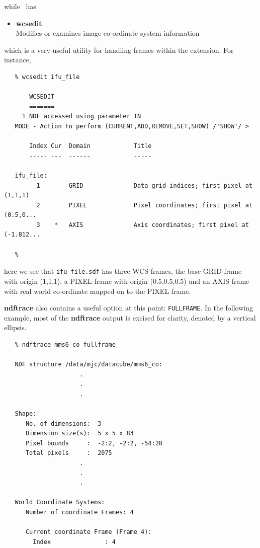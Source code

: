 \documentclass[twoside,11pt]{article}
\newcommand{\xref}[3]{#1}
\begin{document}
\begin{\htmlonly}
{while \CCDPACK\ has

\begin{itemize}  
\item{\xref{{\bf wcsedit}}{sun139}{WCSEDIT}}\\
Modifies or examines image co-ordinate system information
\end{itemize}

which is a very useful utility for handling frames within the extension.
For instance,

\small\begin{verbatim}
   % wcsedit ifu_file

       WCSEDIT
       =======
     1 NDF accessed using parameter IN
   MODE - Action to perform (CURRENT,ADD,REMOVE,SET,SHOW) /'SHOW'/ > 

       Index Cur  Domain            Title
       ----- ---  ------            -----

   ifu_file:
         1        GRID              Data grid indices; first pixel at (1,1,1)
         2        PIXEL             Pixel coordinates; first pixel at (0.5,0...
         3    *   AXIS              Axis coordinates; first pixel at (-1.812...

   %
\end{verbatim}\normalsize

here we see that {\tt ifu\_file.sdf} has three WCS frames, the base
GRID frame with origin (1,1,1), a PIXEL frame with origin
(0.5,0.5,0.5) and an AXIS frame with real world co-ordinate mapped
on to the PIXEL frame.  

\xref{{\bf ndftrace}}{sun95}{NDFTRACE} also contains a useful option at this
point: {\tt FULLFRAME}.  In the following example, most of the {\bf ndftrace}
output is excised for clarity, denoted by a vertical ellipsis.

\small\begin{verbatim}
   % ndftrace mms6_co fullframe

   NDF structure /data/mjc/datacube/mms6_co:
                     .
                     .
                     .

   Shape:
      No. of dimensions:  3
      Dimension size(s):  5 x 5 x 83
      Pixel bounds     :  -2:2, -2:2, -54:28
      Total pixels     :  2075
                     .
                     .
                     .

   World Coordinate Systems:
      Number of coordinate Frames: 4

      Current coordinate Frame (Frame 4):
        Index               : 4


\end{verbatim}}
\end{\htmlonly}
\end{document}

